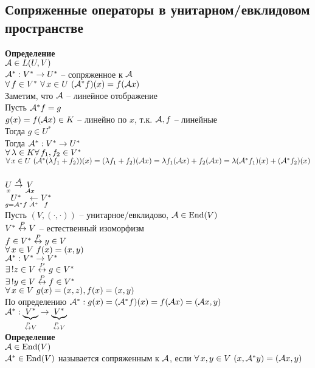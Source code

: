\documentclass[12pt]{article}
\begin{document}
\subsection{Сопряженные операторы в унитарном/евклидовом пространстве}
\textbf{Определение}\\
$\mcA \in L(U, V)$\\
$\mcA^*: V^* \rto U^*$ -- сопряженное к $\mcA$\\
$\fall f \in V^*\ \fall x \in U\ (\mcA^* f)(x) = f(\mcA x)$\\
Заметим, что $\mcA$ -- линейное отображение\\
Пусть $\mcA^* f = g$\\
$g(x) = f(\mcA x) \in K$ -- линейно по $x$, т.к. $\mcA, f$ -- линейные\\
Тогда $g \in U^*$\\
Тогда $\mcA^*: V^*\rto U^*$\\
$\fall \lambda \in K \fall f_1, f_2 \in V^*$\\
$\fall x \in U\ (\mcA^*(\lambda f_1 + f_2))(x) = ( \lambda f_1 + f_2)(\mcA x) = \lambda f_1(\mcA x) + f_2(\mcA x) = \lambda(\mcA^* f_1)(x)  + (\mcA^* f_2)(x)$\\\\
$\us x U \os \mcA \rto \us{\mcA x}V$\\
$\us{g=\mcA^* f}{U^*} \us{\mcA^*}\lto \us f {V^*}$\\
Пусть $(V, (\cdot, \cdot))$ -- унитарное/евклидово, $\mcA \in \nm{End}(V)$\\
$V^* \os P \lrto V$ -- естественный изоморфизм\\
$f \in V^* \os P \lrto y\in V$\\
$\fall x \in V\ f(x) = (x,y)$\\
$\mcA^*: V^* \rto V^*$\\
$\ex!  z \in V \os P \lrto g \in V^*$\\
$\ex! y \in V \os P \lrto f \in V^*$\\
$\fall x \in V\ g(x) = (x, z), f(x) = (x, y)$\\
По определению $\mcA^*: g(x) = (\mcA^* f)(x) = f(\mcA x) = (\mcA x, y)$\\
$\mcA^*: \ub{\os P \lrto V}{V^*} \rto \ub{\os P \lrto V}{V^*}$\\
\textbf{Определение}\\
$\mcA \in \nm{End}(V)$\\
$\mcA^* \in \nm{End}(V)$ называется сопряженным к $\mcA$, если $\fall x, y \in V\ (x, \mcA^* y) = (\mcA x,y)$\\
\end{document}
